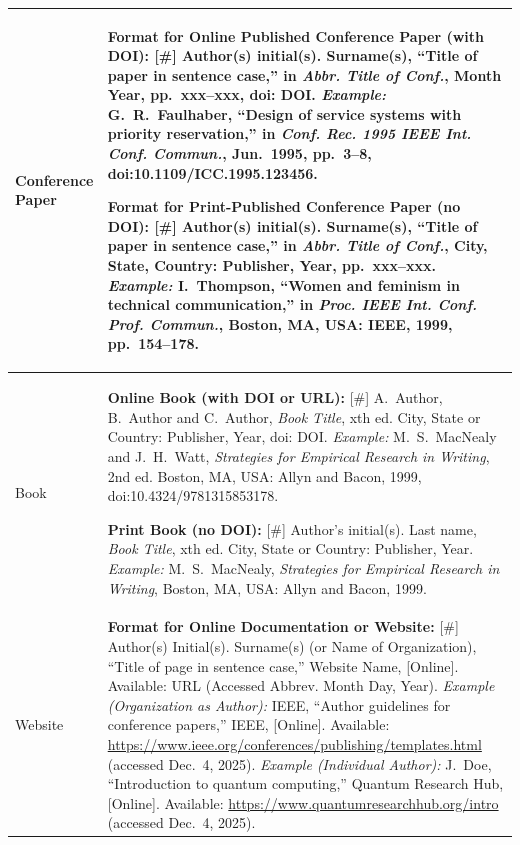\begin{xltabular}{\textwidth}{>{\bfseries\raggedright\arraybackslash}p{0.24\textwidth} >{\raggedright\arraybackslash}X}
  Conference Paper & 
  \textbf{Format for Online Published Conference Paper (with DOI):}\newline
  {[}\#] Author(s) initial(s). Surname(s), ``Title of paper in sentence case,'' in \textit{Abbr. Title of Conf.}, Month Year, pp.~xxx--xxx, doi: DOI.\newline
  \textit{Example:} G.~R.~Faulhaber, ``Design of service systems with priority reservation,'' in \textit{Conf. Rec. 1995 IEEE Int. Conf. Commun.}, Jun.~1995, pp.~3--8, doi:10.1109/ICC.1995.123456.\par\vspace{6pt}
  \textbf{Format for Print-Published Conference Paper (no DOI):}\newline
  {[}\#] Author(s) initial(s). Surname(s), ``Title of paper in sentence case,'' in \textit{Abbr. Title of Conf.}, City, State, Country: Publisher, Year, pp.~xxx--xxx.\newline
  \textit{Example:} I.~Thompson, ``Women and feminism in technical communication,'' in \textit{Proc. IEEE Int. Conf. Prof. Commun.}, Boston, MA, USA: IEEE, 1999, pp.~154--178. \\
  \midrule

  Book & 
  \textbf{Online Book (with DOI or URL):}\newline
  {[}\#] A.~Author, B.~Author and C.~Author, \textit{Book Title}, xth ed. City, State or Country: Publisher, Year, doi: DOI.\newline
  \textit{Example:} M.~S.~MacNealy and J.~H.~Watt, \textit{Strategies for Empirical Research in Writing}, 2nd ed. Boston, MA, USA: Allyn and Bacon, 1999, doi:10.4324/9781315853178.\par\vspace{6pt}
  \textbf{Print Book (no DOI):}\newline
  {[}\#] Author's initial(s). Last name, \textit{Book Title}, xth ed. City, State or Country: Publisher, Year.\newline
  \textit{Example:} M.~S.~MacNealy, \textit{Strategies for Empirical Research in Writing}, Boston, MA, USA: Allyn and Bacon, 1999. \\
  \midrule

  Website & 
  \textbf{Format for Online Documentation or Website:}\newline
  {[}\#] Author(s) Initial(s). Surname(s) (or Name of Organization), ``Title of page in sentence case,'' Website Name, [Online]. Available: URL (Accessed Abbrev. Month Day, Year).\newline
  \textit{Example (Organization as Author):} IEEE, ``Author guidelines for conference papers,'' IEEE, [Online]. Available: \url{https://www.ieee.org/conferences/publishing/templates.html} (accessed Dec.~4, 2025).\newline
  \textit{Example (Individual Author):} J.~Doe, ``Introduction to quantum computing,'' Quantum Research Hub, [Online]. Available: \url{https://www.quantumresearchhub.org/intro} (accessed Dec.~4, 2025). \\
  \midrule


\end{xltabular}
